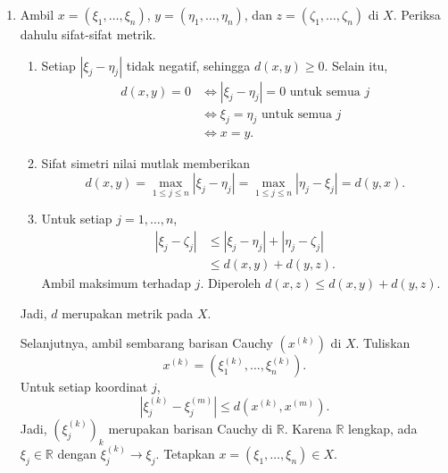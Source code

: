 \documentclass[11pt,a4paper]{article}
\newcommand{\R}{\mathbb{R}}
\begin{document}
\begin{enumerate}[itemsep=12pt,parsep=5pt]
\begin{enumerate}
          \item Fungsi nol berada di $W$ karena nilainya di $x=0$ adalah nol.
                Namun,
                \[
                  g(0)=\frac{\delta}{2}\ne0.
                \]
                Jadi, $g\notin W$.
                Untuk setiap $\delta>0$, bola $B(0,\delta)$ memuat fungsi di luar $W$.
                Maka, tidak ada bola terbuka berpusat di $0$ yang termuat dalam $W$.
                Karena $0\in W$, himpunan $W$ bukan himpunan terbuka.
        \end{enumerate}

  \item Ambil $x=(\xi_1,\ldots,\xi_n)$, $y=(\eta_1,\ldots,\eta_n)$,
        dan $z=(\zeta_1,\ldots,\zeta_n)$ di $X$.
        Periksa dahulu sifat-sifat metrik.
        \begin{enumerate}
          \item Setiap $|\xi_j-\eta_j|$ tidak negatif, sehingga $d(x,y)\ge0$.
                Selain itu,
                \begin{align*}
                  d(x,y)=0
                   & \Longleftrightarrow |\xi_j-\eta_j|=0
                  \text{ untuk semua }j                   \\
                   & \Longleftrightarrow \xi_j=\eta_j
                  \text{ untuk semua }j                   \\
                   & \Longleftrightarrow x=y.
                \end{align*}

          \item Sifat simetri nilai mutlak memberikan
                \[
                  d(x,y)=\max_{1\le j\le n}|\xi_j-\eta_j|
                  =\max_{1\le j\le n}|\eta_j-\xi_j|
                  =d(y,x).
                \]

          \item Untuk setiap $j=1,\ldots,n$,
                \begin{align*}
                  |\xi_j-\zeta_j|
                   & \le |\xi_j-\eta_j|+|\eta_j-\zeta_j| \\
                   & \le d(x,y)+d(y,z).
                \end{align*}
                Ambil maksimum terhadap $j$.
                Diperoleh $d(x,z)\le d(x,y)+d(y,z)$.
        \end{enumerate}
        Jadi, $d$ merupakan metrik pada $X$.

        Selanjutnya, ambil sembarang barisan Cauchy $(x^{(k)})$ di $X$.
        Tuliskan
        \[
          x^{(k)}=(\xi_1^{(k)},\ldots,\xi_n^{(k)}).
        \]
        Untuk setiap koordinat $j$,
        \[
          |\xi_j^{(k)}-\xi_j^{(m)}|\le d(x^{(k)},x^{(m)}).
        \]
        Jadi, $(\xi_j^{(k)})_k$ merupakan barisan Cauchy di $\R$.
        Karena $\R$ lengkap, ada $\xi_j\in\R$ dengan $\xi_j^{(k)}\to\xi_j$.
        Tetapkan $x=(\xi_1,\ldots,\xi_n)\in X$.


\end{enumerate}
\end{document}
